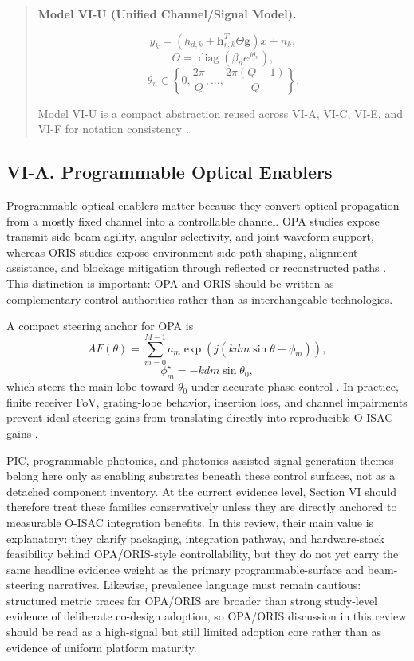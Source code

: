 \begin{quote}
\textbf{Model VI-U (Unified Channel/Signal Model).}

\[
y_k = \left(h_{d,k} + \mathbf{h}_{r,k}^{T}\Theta\mathbf{g}\right)x + n_k,
\]
\[
\Theta = \operatorname{diag}\!\left(\beta_n e^{j\theta_n}\right),
\]
\[
\theta_n \in \left\{0,\frac{2\pi}{Q},\ldots,\frac{2\pi(Q-1)}{Q}\right\}.
\]

Model VI-U is a compact abstraction reused across VI-A, VI-C, VI-E, and VI-F for notation consistency \cite{O_ISAC_061,O_ISAC_091,O_ISAC_098,O_ISAC_127}.
\end{quote}

\subsection{VI-A. Programmable Optical Enablers}

Programmable optical enablers matter because they convert optical propagation from a mostly fixed channel into a controllable channel. OPA studies expose transmit-side beam agility, angular selectivity, and joint waveform support, whereas ORIS studies expose environment-side path shaping, alignment assistance, and blockage mitigation through reflected or reconstructed paths \cite{O_ISAC_008,O_ISAC_061,O_ISAC_091,O_ISAC_098,O_ISAC_112}. This distinction is important: OPA and ORIS should be written as complementary control authorities rather than as interchangeable technologies.

A compact steering anchor for OPA is
\[
AF(\theta)=\sum_{m=0}^{M-1} a_m\exp\!\left(j\left(kdm\sin\theta+\phi_m\right)\right),
\]
\[
\phi_m^{\star}=-kdm\sin\theta_0,
\]
which steers the main lobe toward $\theta_0$ under accurate phase control \cite{O_ISAC_008,O_ISAC_061,O_ISAC_091}. In practice, finite receiver FoV, grating-lobe behavior, insertion loss, and channel impairments prevent ideal steering gains from translating directly into reproducible O-ISAC gains \cite{O_ISAC_061,O_ISAC_091,O_ISAC_098}.

PIC, programmable photonics, and photonics-assisted signal-generation themes belong here only as enabling substrates beneath these control surfaces, not as a detached component inventory. At the current evidence level, Section VI should therefore treat these families conservatively unless they are directly anchored to measurable O-ISAC integration benefits. In this review, their main value is explanatory: they clarify packaging, integration pathway, and hardware-stack feasibility behind OPA/ORIS-style controllability, but they do not yet carry the same headline evidence weight as the primary programmable-surface and beam-steering narratives. Likewise, prevalence language must remain cautious: structured metric traces for OPA/ORIS are broader than strong study-level evidence of deliberate co-design adoption, so OPA/ORIS discussion in this review should be read as a high-signal but still limited adoption core rather than as evidence of uniform platform maturity.

